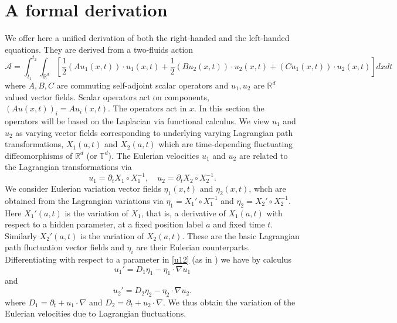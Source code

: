 \documentclass[11pt,reqno]{amsproc}
\newcommand{\pa}{\partial}
\newcommand{\la}{\label}
\newcommand{\fr}{\frac}
\newcommand{\na}{\nabla}
\newcommand{\be}{\begin{equation}}
\newcommand{\ee}{\end{equation}}
\newcommand{\Rr}{{\mathbb R}}
\newcommand{\R}{\mathbb{R}}
\begin{document}
 \section{A formal derivation}\la{deriv}
 We offer here a unified derivation of both the right-handed and the left-handed equations. They are derived from a two-fluids action
 \be
 \mathcal A = \int_{t_1}^{t_2} \int_{\R^d}\left [\fr{1}{2}(A u_1(x,t))\cdot  u_1(x,t)  + \fr{1}{2}(Bu_2(x,t))\cdot u_2(x,t) + (Cu_1(x,t)) \cdot u_2(x,t)\right ]dx dt
\la{action}
\ee
where $A, B, C$ are commuting self-adjoint scalar operators and $u_1, u_2$ are $\Rr^d$ valued vector fields.
  Scalar operators act on components, $(Au(x,t))_i = Au_i(x,t)$. The operators act in $x$. In this section the operators will be based on the Laplacian via functional calculus. We view $u_1$ and $u_2$ as varying vector fields corresponding to underlying varying Lagrangian path transformations, $X_1(a,t)$ and $X_2(a,t)$ which are time-depending fluctuating diffeomorphisms of $\Rr^d$ (or $\mathbb T^d$).  The Eulerian velocities $u_1$ and $u_2$ are related to the Lagrangian transformations via 
  \be 
u_1 = \pa_t X_1\circ X_1^{-1}, \quad u_2 = \pa_tX_2\circ X_2^{-1}.
\la{u12}
\ee
We consider Eulerian variation vector fields  $\eta_1(x,t)$ and $\eta_2(x,t)$,  whch are obtained from the Lagrangian variations via  $\eta_1 = X_1'\circ X_1^{-1}$ and $\eta_2 = X_2'\circ X_2^{-1}$. Here $X_1'(a,t)$ is the variation of $X_1$, that is, a derivative of $X_1(a,t)$ with respect to a hidden parameter, at a fixed position label $a$ and fixed time $t$. Similarly $X_2'(a,t)$ is the variation of $X_2(a,t)$. These are the basic Lagrangian path fluctuation vector fields and $\eta_i$ are their Eulerian counterparts.   
Differentiating with respect to a parameter in \eqref{u12} (as in \cite{hydro})  we have by calculus
\be
u_1' = D_1\eta_1 -\eta_1\cdot\na u_1
\la{u1'}
\ee
and
\be
u_2' = D_2\eta_2 -\eta_2\cdot\na u_2.
\la{u2'}
\ee
where $D_1 = \pa_t + u_1\cdot\na $ and $D_2 = \pa_t  + u_2\cdot\na$. We thus obtain the variation of  the Eulerian velocities  due to Lagrangian fluctuations.  
\end{document}
